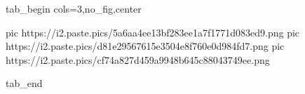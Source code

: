  
 
 
 
 


\ifcmt
  tab_begin cols=3,no_fig,center

     pic https://i2.paste.pics/5a6aa4ee13bf283ee1a7f1771d083ed9.png
		 pic https://i2.paste.pics/d81e29567615e3504e8f760e0d984fd7.png
		 pic https://i2.paste.pics/cf74a827d459a9948b645c88043749ee.png

  tab_end
\fi
